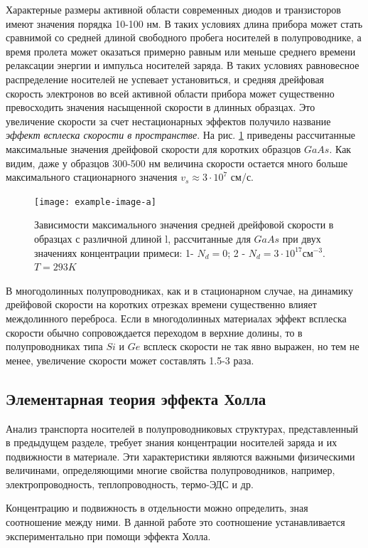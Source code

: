 Характерные размеры активной области современных диодов и транзисторов имеют значения порядка 10-100 нм. В таких условиях длина прибора может стать сравнимой со средней длиной свободного пробега носителей в полупроводнике, а время пролета может оказаться примерно равным или меньше среднего времени релаксации энергии и импульса носителей заряда. В таких условиях равновесное распределение носителей не успевает установиться, и средняя дрейфовая скорость электронов во всей активной области прибора может существенно превосходить значения насыщенной скорости в длинных образцах. Это увеличение скорости за счет нестационарных эффектов получило название \textit{эффект всплеска скорости в пространстве}. На рис. \ref{fig:7} приведены рассчитанные максимальные значения дрейфовой скорости для коротких образцов $GaAs$. Как видим, даже у образцов 300-500 нм величина скорости остается много больше максимального стационарного значения $v_s \approx 3\cdot 10^7$ см/с.
\begin{figure}[h!]
	\centering
	\texttt{[image: example-image-a]}
	\caption{Зависимости максимального значения средней дрейфовой скорости в образцах с различной длиной l, рассчитанные для $GaAs$ при двух значениях концентрации примеси: 1- $N_d=0$; 2 - $N_d=3\cdot 10^{17} \text{см}^{-3}$. $T=293 K$}
	\label{fig:7}
\end{figure}

В многодолинных полупроводниках, как и в стационарном случае, на динамику дрейфовой скорости на коротких отрезках времени существенно влияет междолинного переброса. Если в многодолинных материалах эффект всплеска скорости обычно сопровождается переходом в верхние долины, то в полупроводниках типа $Si$ и $Ge$ всплеск скорости не так явно выражен, но тем не менее, увеличение скорости может составлять 1.5-3 раза.

\subsection{Элементарная теория эффекта Холла}
Анализ транспорта носителей в полупроводниковых структурах, представленный в предыдущем разделе, требует знания концентрации носителей заряда и их подвижности в материале. Эти характеристики являются важными физическими величинами, определяющими многие свойства полупроводников, например, электропроводность, теплопроводность, термо-ЭДС и др.

Концентрацию и подвижность в отдельности можно определить, зная соотношение между ними. В данной работе это соотношение устанавливается экспериментально при помощи эффекта Холла.

